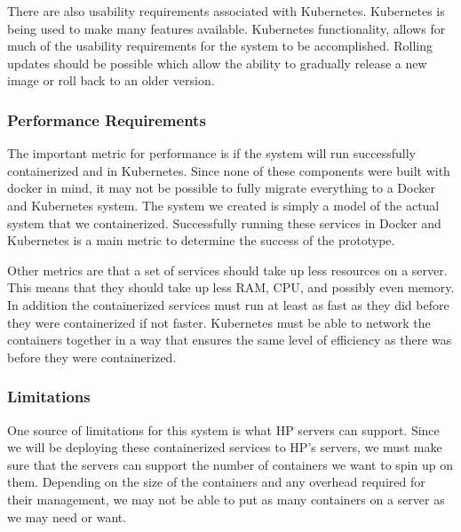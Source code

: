 \documentclass[onecolumn, draftclsnofoot,10pt, compsoc]{IEEEtran}
\begin{document}
There are also usability requirements associated with Kubernetes.
Kubernetes is being used to make many features available.
Kubernetes functionality, allows for much of the usability requirements for the system to be accomplished. Rolling updates should be possible which allow the ability to gradually release a new image or roll back to an older version.



\subsubsection{Performance Requirements}

The important metric for performance is if the system will run successfully containerized and in Kubernetes. 
Since none of these components were built with docker in mind, it may not be possible to fully migrate everything to a Docker and Kubernetes system. 
The system we created is simply a model of the actual system that we containerized.
Successfully running these services in Docker and Kubernetes is a main metric to determine the success of the prototype.

Other metrics are that a set of services should take up less resources on a server. 
This means that they should take up less RAM, CPU, and possibly even memory.
In addition the containerized services must run at least as fast as they did before they were containerized if not faster.
Kubernetes must be able to network the containers together in a way that ensures the same level of efficiency as there was before they were containerized. 



\subsubsection{Limitations}

One source of limitations for this system is what HP servers can support.
Since we will be deploying these containerized services to HP’s servers, we must make sure that the servers can support the number of containers we want to spin up on them.
Depending on the size of the containers and any overhead required for their management, we may not be able to put as many containers on a server as we may need or want. 
\end{document}
